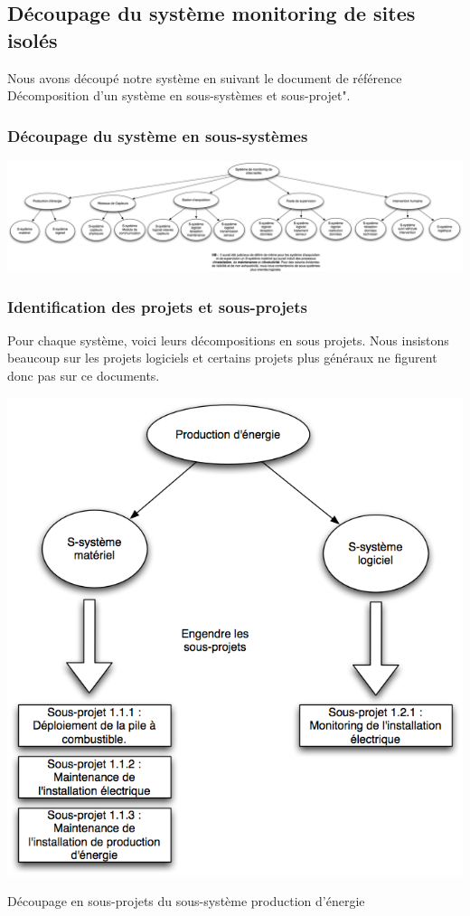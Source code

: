 \subsection{Découpage du système monitoring de sites isolés}
Nous avons découpé notre système en suivant le document de référence \og Décomposition d'un système en sous-systèmes et sous-projet".

\subsubsection{Découpage du système en sous-systèmes}

\begin {center}
\includegraphics[width=\textwidth]{png/graphDecompoSousSystemes.png}
\end {center}

\subsubsection{Identification des projets et sous-projets}
Pour chaque système, voici leurs décompositions en sous projets. Nous insistons beaucoup sur les projets logiciels et certains projets plus \og généraux \fg ne figurent donc pas sur ce documents.

\begin {center}
\includegraphics[width=\textwidth]{png/ss1ProdE.png}
\caption{Découpage en sous-projets du sous-système production d'énergie}
\end {center} 

